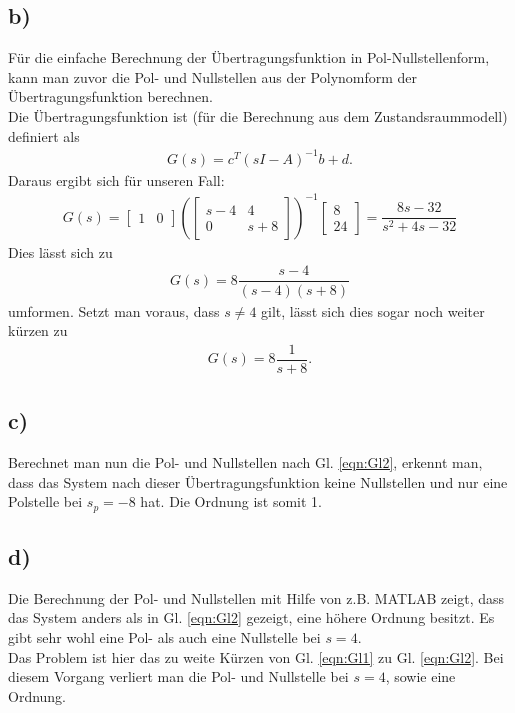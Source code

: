 \documentclass[11pt]{scrartcl} %
\begin{document}
\subsection*{b)}
Für die einfache Berechnung der Übertragungsfunktion in Pol-Nullstellenform, kann man zuvor die Pol- und Nullstellen aus der Polynomform der Übertragungsfunktion berechnen.\\
Die Übertragungsfunktion ist (für die Berechnung aus dem Zustandsraummodell) definiert als
\begin{align*}
G(s) = c^T(sI-A)^{-1}b+d.
\end{align*}
Daraus ergibt sich für unseren Fall:
\begin{align*}
G(s)=
\begin{bmatrix}
1 & 0
\end{bmatrix}
\left(
\begin{bmatrix}
s-4 & 4\\
0 & s+8
\end{bmatrix}
\right)^{-1}
\begin{bmatrix}
8\\
24
\end{bmatrix}
=
\dfrac{8s-32}{s^2+4s-32}
\end{align*}
Dies lässt sich zu
\begin{align} \tag{1}
\label{eqn:Gl1}
G(s)=8\dfrac{s-4}{(s-4)(s+8)}
\end{align}
umformen. Setzt man voraus, dass $s \neq 4$ gilt, lässt sich dies sogar noch weiter kürzen zu
\begin{align} \tag{2}
\label{eqn:Gl2}
G(s) = 8 \dfrac{1}{s+8}.
\end{align}
\subsection*{c)}
\label{sec:1c}
Berechnet man nun die Pol- und Nullstellen nach Gl. \ref{eqn:Gl2}, erkennt man, dass das System nach dieser Übertragungsfunktion keine Nullstellen und nur eine Polstelle bei $s_p=-8$ hat. Die Ordnung ist somit 1.

\subsection*{d)}
Die Berechnung der Pol- und Nullstellen mit Hilfe von z.B. MATLAB zeigt, dass das System anders als in Gl. \ref{eqn:Gl2} gezeigt, eine höhere Ordnung besitzt. Es gibt sehr wohl eine Pol- als auch eine Nullstelle bei $s=4$.\\
Das Problem ist hier das zu weite Kürzen von Gl. \ref{eqn:Gl1} zu Gl. \ref{eqn:Gl2}. Bei diesem Vorgang verliert man die Pol- und Nullstelle bei $s=4$, sowie eine Ordnung.
\end{document}
